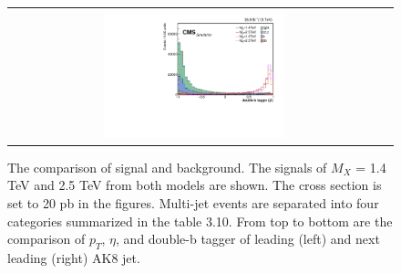 \begin{figure}[t]
\begin{tabular}{cc}
    \includegraphics[width=0.5\textwidth]{Figures/MC_N1/doubleSV_j1.pdf} \\
  \end{tabular}
  \caption{The comparison of signal and background. The signals of $M_{X}$ = 1.4 TeV and 2.5 TeV from both models are shown. The cross section is set to 20 pb in the figures. Multi-jet events are separated into four categories summarized in the table 3.10. From top to bottom are the comparison of $p_{T}$, $\eta $, and double-b tagger of leading (left) and next leading (right) AK8 jet.}
  \label{fig:hvt_brs}
\end{figure}

